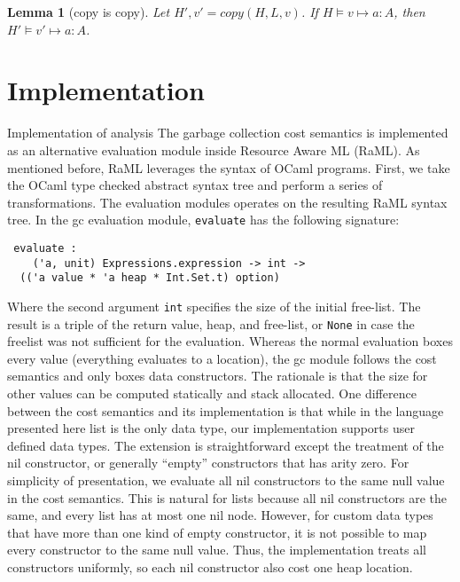 \documentclass{easychair}
\newcommand{\jan}[1]{{\color{red} #1}}
\newtheorem{lemma}[theorem]{Lemma}
\theoremstyle{definition}
\begin{document}
\begin{lemma}[copy is copy]
	Let $H',v' = copy(H,L,v)$. If $H \vDash v \mapsto a : A$, then $H' \vDash v' \mapsto a : A$.
\end{lemma}




\section{Implementation}
\label{sect:implementation}

\jan{Implementation of analysis}
The garbage collection cost semantics is implemented as an alternative evaluation module inside
Resource Aware ML (RaML). As mentioned before, RaML leverages the syntax of OCaml programs. 
First, we take the OCaml type checked abstract syntax tree and perform a series of transformations. 
The evaluation modules operates on the resulting RaML syntax tree. 
In the gc evaluation module, \texttt{evaluate} has the following signature:

\begin{verbatim}
 evaluate : 
    ('a, unit) Expressions.expression -> int ->
  (('a value * 'a heap * Int.Set.t) option) 
\end{verbatim}

Where the second argument \texttt{int} specifies the size of the initial free-list.
The result is a triple of the return value, heap, and free-list, or \texttt{None} 
in case the freelist was not sufficient for the evaluation.
Whereas the normal evaluation boxes every value (everything evaluates to a location), 
the gc module follows the cost semantics and only boxes data constructors. The rationale is
that the size for other values can be computed statically and stack allocated. One difference
between the cost semantics and its implementation is that while in the language presented here
list is the only data type, our implementation supports user defined data types. The extension
is straightforward except the treatment of the nil constructor, or generally ``empty'' constructors
that has arity zero. For simplicity of presentation, we evaluate all nil constructors to
the same null value in the cost semantics. This is natural for lists because all nil constructors 
are the same, and every list has at most one nil node. However, for custom data types that have 
more than one kind of empty constructor, it is not possible to map every constructor to the same 
null value. Thus, the implementation treats all constructors uniformly, so each nil constructor
also cost one heap location. 
\end{document}
